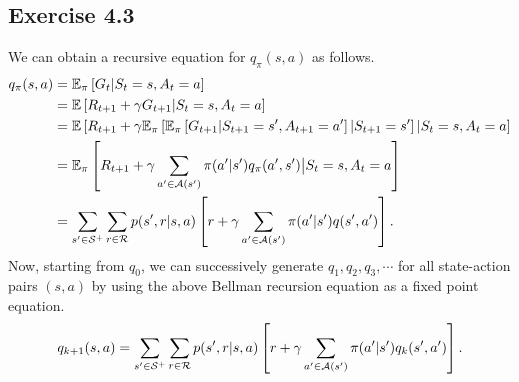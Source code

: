 \documentclass[10pt]{article}
\begin{document}
	 \subsection*{Exercise 4.3}
	 \label{ss:4.3}
	 We can obtain a recursive equation for $q_\pi(s,a)$ as follows.
	 \begin{align*}
	 q_\pi(s,a) &= \mathbb{E}_\pi \left[ G_t | S_t=s, A_t = a\right]\\
	 &= \mathbb{E}\left[ R_{t+1} + \gamma G_{t+1} | S_t = s, A_t = a \right]\\
	 &= \mathbb{E} \left[ R_{t+1} + \gamma \mathbb{E}_\pi \left[ \mathbb{E}_\pi \left[ G_{t+1} | S_{t+1}=s', A_{t+1}=a' \right] | S_{t+1} = s' \right] | S_t = s, A_t = a \right]\\
	 &= \mathbb{E}_\pi \left[ R_{t+1} + \gamma \sum_{a'\in\mathcal{A}(s')} \pi(a'|s') q_\pi(a',s') \big| S_t =s, A_t = a \right]\\
	 &= \sum_{s'\in\mathcal{S}^+} \sum_{r\in\mathcal{R}} p(s',r|s,a) \left[ r + \gamma \sum_{a'\in\mathcal{A}(s')} \pi(a'|s')q(s',a') \right].
	 \end{align*}
	 Now, starting from $q_0$, we can successively generate $q_1,q_2,q_3,\cdots$ for all state-action pairs $(s,a)$ by using the above Bellman recursion equation as a fixed point equation.
	 \begin{align*}
	 q_{k+1}(s,a) = \sum_{s'\in\mathcal{S}^+} \sum_{r\in\mathcal{R}} p(s',r|s,a) \left[ r + \gamma \sum_{a'\in\mathcal{A}(s')} \pi(a'|s') q_k(s',a') \right].
	 \end{align*}
\end{document}
